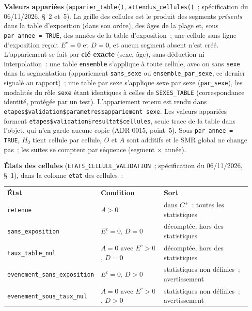 \documentclass[a4paper,11pt]{article}
\newcommand{\code}[1]{\texttt{\small #1}}
\begin{document}
\medskip
\textbf{Valeurs appariées} (\code{apparier\_table()},
\code{attendus\_cellules()}~; spécification du 06/11/2026, §~2 et~5). La grille des
cellules est le produit des segments \emph{présents} dans la table
d'exposition (dans son ordre), des âges de la plage et, sous
\code{par\_annee = TRUE}, des années de la table d'exposition~; une
cellule sans ligne d'exposition reçoit $E^c = 0$ et $D = 0$, et aucun
segment absent n'est créé. L'appariement se fait par \textbf{clé exacte}
(sexe, âge), sans déduction ni interpolation~: une table \code{ensemble}
s'applique à toute cellule, avec ou sans \code{sexe} dans la segmentation
(appariement \code{sans\_sexe} ou \code{ensemble\_par\_sexe}, ce dernier
signalé au rapport)~; une table par sexe s'applique sexe par sexe
(\code{par\_sexe}), les modalités du rôle \code{sexe} étant identiques à
celles de \code{SEXES\_TABLE} (correspondance identité, protégée par un
test). L'appariement retenu est rendu dans
\code{etapes\$validation\$parametres\$appariement\_sexe}. Les valeurs
appariées forment \code{etapes\$validation\$resultat\$cellules}, seule
trace de la table dans l'objet, qui n'en garde aucune copie (ADR 0015,
point~5). Sous \code{par\_annee = TRUE}, $H_0$ tient cellule par cellule,
$O$ et $A$ sont additifs et le SMR global ne change pas~; les suites se
comptent par séquence (segment $\times$ année).

\medskip
\noindent
\textbf{États des cellules} (\code{ETATS\_CELLULE\_VALIDATION}~;
spécification du 06/11/2026, §~1), dans la colonne \code{etat} des cellules~:

\begin{center}
\small
{}
\begin{tabular}{@{}p{4.8cm}p{4.4cm}p{5.4cm}@{}}
\rowcolor{tableheader}
\textcolor{financeblue}{\textbf{État}} &
\textcolor{financeblue}{\textbf{Condition}} &
\textcolor{financeblue}{\textbf{Sort}} \\
\code{retenue} & $A > 0$ & dans $C^{+}$~: toutes les statistiques \\
\code{sans\_exposition} & $E^c = 0$, $D = 0$ & décomptée, hors des statistiques \\
\code{taux\_table\_nul} & $A = 0$ avec $E^c > 0$, $D = 0$ & décomptée, hors des statistiques \\
\code{evenement\_sans\_exposition} & $E^c = 0$, $D > 0$ & statistiques non définies~; avertissement \\
\code{evenement\_sous\_taux\_nul} & $A = 0$ avec $E^c > 0$, $D > 0$ & statistiques non définies~; avertissement \\
\end{tabular}
\end{center}
\end{document}
